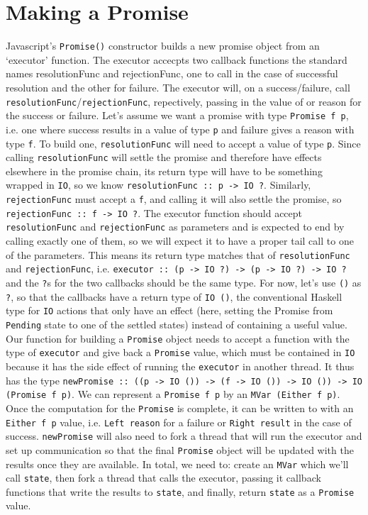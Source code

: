 \documentclass[12pt, english, letterpaper]{kuthesis}
\newcommand{\lit}[1]{\texttt{#1}}
\begin{document}
\section*{Making a Promise}
Javascript's \lit{Promise()} constructor builds a new promise object from an `executor' function.  The executor accecpts two callback functions the standard names resolutionFunc and rejectionFunc, one to call in the case of successful resolution and the other for failure.  The executor will, on a success/failure, call \lit{resolutionFunc}/\lit{rejectionFunc}, repectively, passing in the value of or reason for the success or failure.  Let's assume we want a promise with type \lit{Promise f p}, i.e. one where success results in a value of type \lit p and failure gives a reason with type \lit f.  To build one, \lit{resolutionFunc} will need to accept a value of type \lit p.  Since calling \lit{resolutionFunc} will settle the promise and therefore have effects elsewhere in the promise chain, its return type will have to be something wrapped in \lit{IO}, so we know \lit{resolutionFunc :: p -> IO ?}.  Similarly, \lit{rejectionFunc} must accept a \lit f, and calling it will also settle the promise, so \lit{rejectionFunc :: f -> IO ?}.  The executor function should accept \lit{resolutionFunc} and \lit{rejectionFunc} as parameters and is expected to end by calling exactly one of them, so we will expect it to have a proper tail call to one of the parameters.  This means its return type matches that of \lit{resolutionFunc} and \lit{rejectionFunc}, i.e. \lit{executor :: (p -> IO ?) -> (p -> IO ?) -> IO ?} and the \lit ?s for the two callbacks should be the same type.  For now, let's use \lit{()} as \lit ?, so that the callbacks have a return type of \lit{IO ()}, the conventional Haskell type for \lit{IO} actions that only have an effect (here, setting the Promise from \lit{Pending} state to one of the settled states) instead of containing a useful value.  Our function for building a \lit{Promise} object needs to accept a function with the type of \lit{executor} and give back a \lit{Promise} value, which must be contained in \lit{IO} because it has the side effect of running the \lit{executor} in another thread.  It thus has the type \lit{newPromise :: ((p -> IO ()) -> (f -> IO ()) -> IO ()) -> IO (Promise f p)}.  We can represent a \lit{Promise f p} by an \lit{MVar (Either f p)}.  Once the computation for the \lit{Promise} is complete, it can be written to with an \lit{Either f p} value, i.e. \lit{Left reason} for a failure or \lit{Right result} in the case of success.  \lit{newPromise} will also need to fork a thread that will run the executor and set up communication so that the final \lit{Promise} object will be updated with the results once they are available.  In total, we need to: create an \lit{MVar} which we'll call \lit{state}, then fork a thread that calls the executor, passing it callback functions that write the results to \lit{state}, and finally, return \lit{state} as a \lit{Promise} value.
\end{document}
